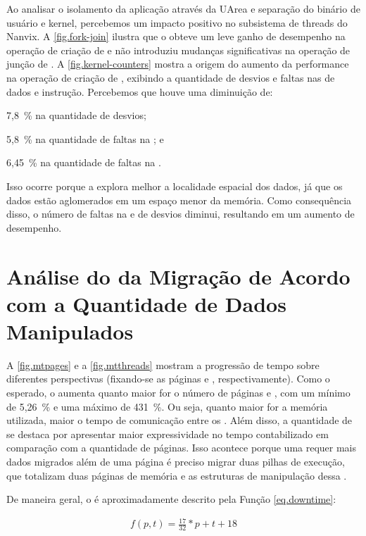 Ao analisar o isolamento da aplicação através da UArea e separação do binário de usuário e kernel, percebemos um impacto positivo no subsistema de threads do Nanvix. A \autoref{fig.fork-join} ilustra que o \nanvix obteve um leve ganho de desempenho na operação de criação de \threads e não introduziu mudanças significativas na operação de junção de \threads. A \autoref{fig.kernel-counters} mostra a origem do aumento da performance na operação de criação de \threads, exibindo a quantidade de desvios e faltas nas \caches de dados e instrução. Percebemos que houve uma diminuição de:
\begin{inlinelist}
    \item 7,8~\% na quantidade de desvios;
    \item 5,8~\% na quantidade de faltas na \dcache; e
    \item 6,45~\% na quantidade de faltas na \icache.
\end{inlinelist}
Isso ocorre porque a \uarea explora melhor a localidade espacial dos dados, já que os dados estão aglomerados em um espaço menor da memória. Como consequência disso, o número de faltas na \cache e de desvios diminui, resultando em um aumento de desempenho.

\section{Análise do \downtime da Migração de Acordo com a Quantidade de Dados Manipulados}

A \autoref{fig.mtpages} e a \autoref{fig.mtthreads} mostram a progressão de tempo sobre diferentes perspectivas (fixando-se as páginas e \threads, respectivamente). Como o esperado, o \downtime aumenta quanto maior for o número de páginas e \threads, com um mínimo de 5,26~\% e uma máximo de 431~\%. Ou seja, quanto maior for a memória utilizada, maior o tempo de comunicação entre os \clusters. Além disso, a quantidade de \threads se destaca por apresentar maior expressividade no tempo contabilizado em comparação com a quantidade de páginas. Isso acontece porque uma \thread requer mais dados migrados além de uma página \eg é preciso migrar duas pilhas de execução, que totalizam duas páginas de memória e as estruturas de manipulação dessa \thread.

De maneira geral, o \downtime é aproximadamente descrito pela Função \ref{eq.downtime}:

\begin{equation}\label{eq.downtime}
    \begin{split}
        f(p, t) = \frac{17}{32}*p+t+18
    \end{split}
\end{equation}

